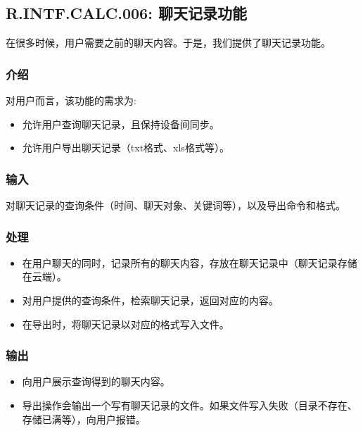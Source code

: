 \subsection{R.INTF.CALC.006: 聊天记录功能}
在很多时候，用户需要之前的聊天内容。于是，我们提供了聊天记录功能。
\subsubsection{介绍}
对用户而言，该功能的需求为:
\begin{itemize}
  \item 允许用户查询聊天记录，且保持设备间同步。
  \item 允许用户导出聊天记录（txt格式、xls格式等）。
\end{itemize}
\subsubsection{输入}
对聊天记录的查询条件（时间、聊天对象、关键词等），以及导出命令和格式。
\subsubsection{处理}
\begin{itemize}
  \item 在用户聊天的同时，记录所有的聊天内容，存放在聊天记录中（聊天记录存储在云端）。
  \item 对用户提供的查询条件，检索聊天记录，返回对应的内容。
  \item 在导出时，将聊天记录以对应的格式写入文件。
\end{itemize}
\subsubsection{输出}
\begin{itemize}
  \item 向用户展示查询得到的聊天内容。
  \item 导出操作会输出一个写有聊天记录的文件。如果文件写入失败（目录不存在、存储已满等），向用户报错。
\end{itemize}

